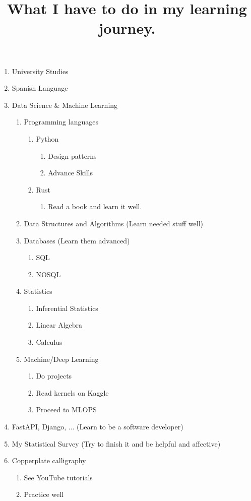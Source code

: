\documentclass{article}
\title{What I have to do in my learning journey.}
\begin{document}
	
	\maketitle
	\begin{enumerate}
		\item University Studies
		\item Spanish Language
		\item Data Science \& Machine Learning
			\begin{enumerate}
			\item Programming languages
				\begin{enumerate}
					\item Python
						\begin{enumerate}
							\item Design patterns
							\item Advance Skills
						\end{enumerate}
					\item Rust
						\begin{enumerate}
							\item Read a book and learn it well.
						\end{enumerate}
				\end{enumerate}
			\item Data Structures and Algorithms ({\footnotesize Learn needed stuff well})
			\item Databases ({\footnotesize Learn them advanced})
				\begin{enumerate}
					\item SQL
					\item NOSQL
				\end{enumerate}
			\item Statistics
				\begin{enumerate}
					\item Inferential Statistics
					\item Linear Algebra
					\item Calculus
				\end{enumerate}
			\item Machine/Deep Learning
				\begin{enumerate}
					\item Do projects
					\item Read kernels on Kaggle
					\item Proceed to MLOPS
				\end{enumerate}
		\end{enumerate}
		\item FastAPI, Django, ... ({\footnotesize Learn to be a software developer})
		\item My Statistical Survey ({\footnotesize Try to finish it and be helpful and affective})
		\item Copperplate calligraphy
			\begin{enumerate}
				\item See YouTube tutorials
				\item Practice well
			\end{enumerate}
	\end{enumerate}				
	
\end{document}
